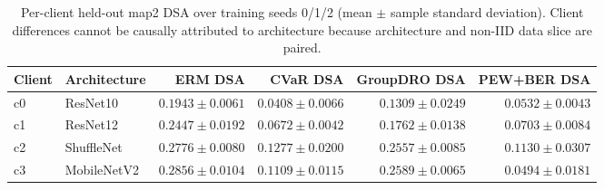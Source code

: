\begin{table}[t]
\centering
\small
\caption{Per-client held-out map2 DSA over training seeds 0/1/2 (mean $\pm$ sample standard deviation). Client differences cannot be causally attributed to architecture because architecture and non-IID data slice are paired.}
\label{tab:per-client-architecture}
\begin{tabular}{llrrrr}
\toprule
Client & Architecture & ERM DSA & CVaR DSA & GroupDRO DSA & PEW+BER DSA \\
\midrule
c0 & ResNet10 & $0.1943\pm0.0061$ & $0.0408\pm0.0066$ & $0.1309\pm0.0249$ & $0.0532\pm0.0043$ \\
c1 & ResNet12 & $0.2447\pm0.0192$ & $0.0672\pm0.0042$ & $0.1762\pm0.0138$ & $0.0703\pm0.0084$ \\
c2 & ShuffleNet & $0.2776\pm0.0080$ & $0.1277\pm0.0200$ & $0.2557\pm0.0085$ & $0.1130\pm0.0307$ \\
c3 & MobileNetV2 & $0.2856\pm0.0104$ & $0.1109\pm0.0115$ & $0.2589\pm0.0065$ & $0.0494\pm0.0181$ \\
\bottomrule
\end{tabular}
\end{table}
